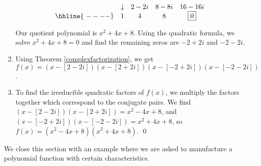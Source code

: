 \begin{ex}
\begin{enumerate}
\[\begin{array}{cccccc}
               & \downarrow &  2-2i  &  8-8i  & 16-16i &\\ \hhline{~----} 
 
                & 1  &  4  & 8& \fbox{0} &   \\

\end{array}\]

Our quotient polynomial is $x^2+4x+8$.  Using the quadratic formula, we solve $x^2+4x+8 = 0$ and find the remaining zeros are $-2+2i$ and $-2-2i$.  

\item  Using Theorem \ref{complexfactorization}, we get $f(x) = (x-[2-2i])(x-[2+2i])(x-[-2+2i])(x-[-2-2i])$.

\item  To find the irreducible quadratic factors of $f(x)$, we multiply the factors together which correspond to the conjugate pairs.  We find $(x-[2-2i])(x-[2+2i]) = x^2-4x+8$, and $(x-[-2+2i])(x-[-2-2i]) = x^2+4x+8$, so  $f(x) =  \left(x^2-4x+8\right) \left(x^2+4x+8\right)$. \qed

\end{enumerate}

\end{ex}

We close this section with an example where we are asked to manufacture a polynomial function with certain characteristics.


